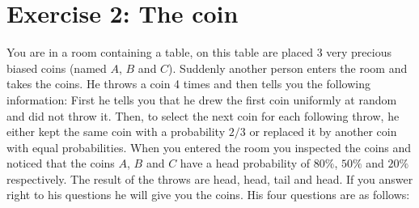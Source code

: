 \documentclass[9pt,a4paper]{extarticle}
\begin{document}
   \section*{Exercise 2: The coin}
   You are in a room containing a table, on this table are placed 3 very precious biased coins (named $A$, $B$ and $C$). Suddenly another person enters the room and takes the coins. He throws a coin 4 times and then tells you the following information:
    First he tells you that he drew the first coin uniformly at random and did not throw it.
    Then, to select the next coin for each following throw, he either kept the same coin with a probability $2/3$ or  replaced it by another coin with equal probabilities.
   When you entered the room you inspected the coins and noticed that the coins $A$, $B$ and $C$ have a head probability of $80\%$, $50\%$ and $20\%$ respectively. The result of the throws are head, head, tail and head. 
   If you answer right to his questions he will give you the coins. His four questions are as follows:
\end{document}
